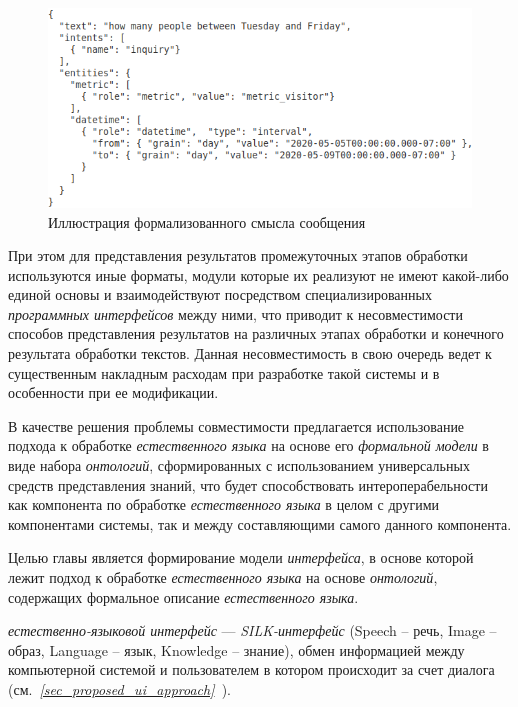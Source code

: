 \begin{figure}[H]
    \centerline{\includegraphics[scale=0.55]{images/part4/chapter_nl_interfaces/message_intents}}
    \caption{Иллюстрация формализованного смысла сообщения}
    \label{fig:message_intents}
\end{figure}

При этом для представления результатов промежуточных этапов обработки используются иные форматы, модули которые их реализуют не имеют какой-либо единой основы и взаимодействуют посредством специализированных \textit{программных интерфейсов} между ними, что приводит к несовместимости способов представления результатов на различных этапах обработки и конечного результата обработки текстов.
Данная несовместимость в свою очередь ведет к существенным накладным расходам при разработке такой системы и в особенности при ее модификации.

В качестве решения проблемы совместимости предлагается использование подхода к обработке \textit{естественного языка} на основе его \textit{формальной модели} в виде набора \textit{онтологий}, сформированных с использованием универсальных средств представления знаний, что будет способствовать интероперабельности как компонента по обработке \textit{естественного языка} в целом с другими компонентами системы, так и между составляющими самого данного компонента.

Целью главы является формирование модели \textit{интерфейса}, в основе которой лежит подход к обработке \textit{естественного языка} на основе \textit{онтологий}, содержащих формальное описание \textit{естественного языка}.

\textit{естественно-языковой интерфейс} --- \textit{SILK-интерфейс} (Speech – речь, Image – образ, Language – язык, Knowledge – знание), обмен информацией между компьютерной системой и пользователем в котором происходит за счет диалога (см.~\textit{\ref{sec_proposed_ui_approach}~}).

